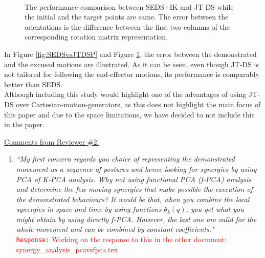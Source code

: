 \documentclass[10pt,stdletter,dateno]{newlfm}
\begin{document}
\begin{newlfm}
\begin{enumerate}
{\begin{figure}[t]
\begin{subfigure}[t]{0.63\textwidth}
			\caption{ }	
			\label{fig:SEDSvsJTDSO}
		\end{subfigure}\\
	\caption{The performance comparison between SEDS+IK and JT-DS while the initial and the target points are same. The error between the orientations is the difference between the first two columns of the corresponding rotation matrix representation.}
	\label{fig:SEDSvsJTDS}
\end{figure}
In Figure \ref{fig:SEDSvsJTDSP} and Figure \ref{fig:SEDSvsJTDSO}, the error between the demonstrated and the excused motions are illustrated. As it can be seen, even though JT-DS is not tailored for following the end-effector motions, its performance is comparably better than SEDS.\\
Although including this study would highlight one of the advantages of using JT-DS over Cartesian-motion-generators, as this does not highlight the main focus of this paper and due to the space limitations, we have decided to not include this in the paper.}
\end{enumerate}





\underline{Comments from Reviewer \#2:}
\begin{enumerate}
\item \textit{``My first concern regards you choice of representing the demonstrated
movement as a sequence of postures and hence looking for synergies by
using PCA of K-PCA analysis. Why not using functional PCA (f-PCA)
analysis and determine the few moving synergies that make possible the
execution of the demonstrated behaviours? It would be that, when you
combine the local synergies in space and time by using functions
$\theta_k(q)$, you get what you might obtain by using directly f-PCA.
However, the last one are valid for the whole movement and can be
combined by constant coefficients."}\\
\textcolor{red}{\texttt{Response:} \small Working on the response to this in the other document: synergy\_analysis\_pcavsfpca.tex}\\


\end{enumerate}
\end{newlfm}
\end{document}
